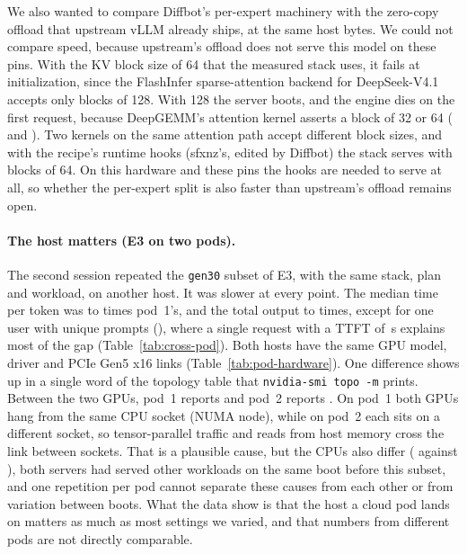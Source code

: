 We also wanted to compare Diffbot's per-expert machinery with the zero-copy offload that upstream vLLM already ships,
at the same host bytes. We could not compare speed, because upstream's offload does not serve this model on these
pins. With the KV block size of 64 that the measured stack uses, it fails at initialization, since the FlashInfer
sparse-attention backend for DeepSeek-V4.1 accepts only blocks of 128. With 128 the server boots, and the engine dies
on the first request, because DeepGEMM's attention kernel asserts a block of 32 or 64
( and ). Two kernels on the
same attention path accept different block sizes, and with the recipe's runtime hooks (sfxnz's, edited by Diffbot)
the stack serves with blocks of 64. On this hardware and these pins the hooks are needed to serve at all, so whether
the per-expert split is also faster than upstream's offload remains open.



\paragraph{The host matters (E3 on two pods).}
The second session repeated the \texttt{gen30} subset of E3, with the same stack, plan and workload, on another host.
It was slower at every point. The median time per token was  to
 times pod~1's, and the total output  to
 times, except for one user with unique prompts
(), where a single request with a TTFT of \,s
explains most of the gap (Table~\ref{tab:cross-pod}). Both hosts have the same GPU model, driver and PCIe Gen5 x16
links (Table~\ref{tab:pod-hardware}). One difference shows up in a single word of the topology table that
\texttt{nvidia-smi topo -m} prints. Between the two GPUs, pod~1 reports \texttt{} and pod~2
reports \texttt{}. On pod~1 both GPUs hang from the same CPU socket (NUMA node), while on
pod~2 each sits on a different socket, so tensor-parallel traffic and reads from host memory cross the link between
sockets. That is a plausible cause, but the CPUs also differ ( against ), both
servers had served other workloads on the same boot before this subset, and one repetition per pod cannot separate
these causes from each other or from variation between boots. What the data show is that the host a cloud pod lands
on matters as much as most settings we varied, and that numbers from different pods are not directly comparable.

